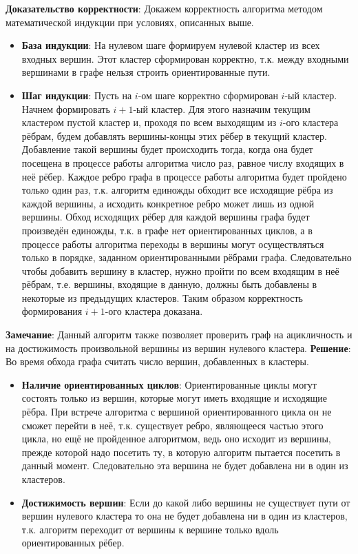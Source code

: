 \textbf{Доказательство корректности}: Докажем корректность алгоритма методом математической индукции при условиях, описанных выше.
\begin{itemize}
	\item \textbf{База индукции}: На нулевом шаге формируем нулевой кластер из всех входных вершин. Этот кластер сформирован корректно, т.к. между входными вершинами в графе нельзя строить ориентированные пути.
	\item \textbf{Шаг индукции}: Пусть на $i$-ом шаге корректно сформирован $i$-ый кластер. Начнем формировать $i+1$-ый кластер. Для этого назначим текущим кластером пустой кластер и, проходя по всем выходящим из $i$-ого кластера рёбрам, будем добавлять вершины-концы этих рёбер в текущий кластер. Добавление такой вершины будет происходить тогда, когда она будет посещена в процессе работы алгоритма число раз, равное числу входящих в неё рёбер. Каждое ребро графа в процессе работы алгоритма будет пройдено только один раз, т.к. алгоритм единожды обходит все исходящие рёбра из каждой вершины, а исходить конкретное ребро может лишь из одной вершины. Обход исходящих рёбер для каждой вершины графа будет произведён единожды, т.к. в графе нет ориентированных циклов, а в процессе работы алгоритма переходы в вершины могут осуществляться только в порядке, заданном ориентированными рёбрами графа. Следовательно чтобы добавить вершину в кластер, нужно пройти по всем входящим в неё рёбрам, т.е. вершины, входящие в данную, должны быть добавлены в некоторые из предыдущих кластеров. Таким образом корректность формирования $i+1$-ого кластера доказана.
\end{itemize}
\textbf{Замечание}: Данный алгоритм также позволяет проверить граф на ацикличность и на достижимость произвольной вершины из вершин нулевого кластера. \newline
\textbf{Решение}: Во время обхода графа считать число вершин, добавленных в кластеры.
\begin{itemize}
	\item \textbf{Наличие ориентированных циклов}: Ориентированные циклы могут состоять только из вершин, которые могут иметь входящие и исходящие рёбра. При встрече алгоритма с вершиной ориентированного цикла он не сможет перейти в неё, т.к. существует ребро, являющееся частью этого цикла, но ещё не пройденное алгоритмом, ведь оно исходит из вершины, прежде которой надо посетить ту, в которую алгоритм пытается посетить в данный момент. Следовательно эта вершина не будет добавлена ни в один из кластеров.
	\item \textbf{Достижимость вершин}: Если до какой либо вершины не существует пути от вершин нулевого кластера то она не будет добавлена ни в один из кластеров, т.к. алгоритм переходит от вершины к вершине только вдоль ориентированных рёбер.
\end{itemize}
